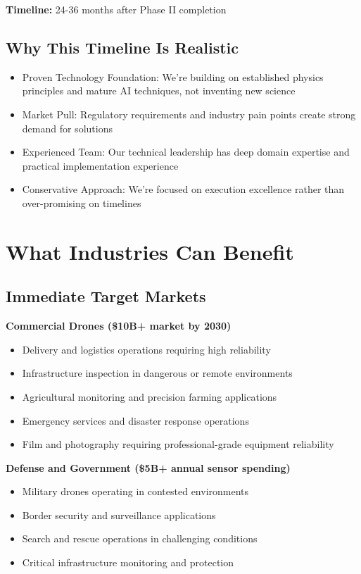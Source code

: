 \documentclass[11pt,letterpaper]{article}
\begin{document}
\textbf{Timeline:} 24-36 months after Phase II completion

\subsection*{Why This Timeline Is Realistic}

\begin{itemize}[leftmargin=10pt, itemsep=1pt]
    \item Proven Technology Foundation: We're building on established physics principles and mature AI techniques, not inventing new science
    \item Market Pull: Regulatory requirements and industry pain points create strong demand for solutions
    \item Experienced Team: Our technical leadership has deep domain expertise and practical implementation experience
    \item Conservative Approach: We're focused on execution excellence rather than over-promising on timelines
\end{itemize}

\section*{What Industries Can Benefit}

\subsection*{Immediate Target Markets}

\textbf{Commercial Drones (\$10B+ market by 2030)}
\begin{itemize}[leftmargin=10pt, itemsep=1pt]
    \item Delivery and logistics operations requiring high reliability
    \item Infrastructure inspection in dangerous or remote environments
    \item Agricultural monitoring and precision farming applications
    \item Emergency services and disaster response operations
    \item Film and photography requiring professional-grade equipment reliability
\end{itemize}

\textbf{Defense and Government (\$5B+ annual sensor spending)}
\begin{itemize}[leftmargin=10pt, itemsep=1pt]
    \item Military drones operating in contested environments
    \item Border security and surveillance applications
    \item Search and rescue operations in challenging conditions
    \item Critical infrastructure monitoring and protection
\end{itemize}
\end{document}
